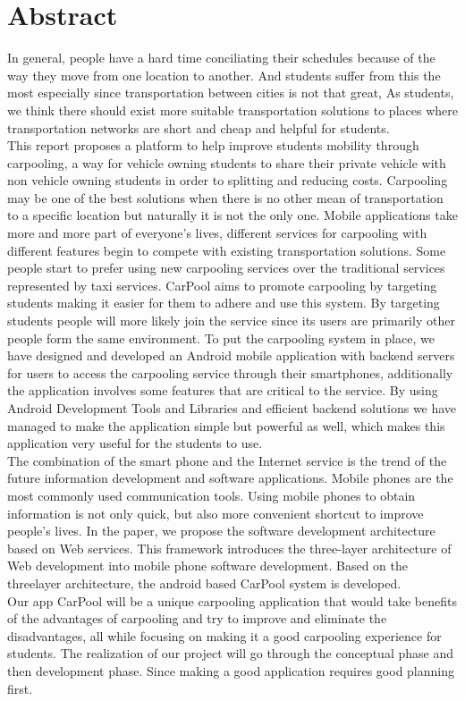 \chapter*{Abstract}
In general, people have a hard time conciliating their schedules because of the way they move from one location to another.  And students suffer from this the most  especially  since transportation between cities is not that great,  As students, we think there should exist more suitable transportation solutions to places where transportation networks are short and cheap and helpful for students.
\\ This  report  proposes  a  platform  to  help  improve students  mobility  through carpooling, a way for vehicle owning students to share their private vehicle with non vehicle owning students in order to splitting and reducing costs. Carpooling may be one of the best solutions when there is no other  mean  of  transportation  to a  specific location  but naturally  it  is not  the  only one. Mobile  applications  take more  and more  part of  everyone’s  lives, different  services for carpooling with different features begin to compete with existing transportation solutions. Some people start to  prefer using  new carpooling  services  over the  traditional services represented  by  taxi  services. CarPool  aims  to  promote  carpooling  by  targeting  students making it easier for them to adhere and use this system.  By  targeting  students  people  will  more  likely  join  the  service  since  its  users  are primarily other people form the same environment. To put the carpooling system in place, we have designed and developed an Android mobile application with backend servers for users  to  access  the  carpooling  service  through  their  smartphones,  additionally  the application  involves  some  features  that  are  critical  to  the  service.  By  using  Android Development  Tools  and  Libraries and  efficient backend  solutions  we  have managed  to make the application simple but powerful as well, which makes this application very useful for the students to use.
\\ The combination of the smart phone and the Internet service is the trend of the future information development and software applications. Mobile phones are the most commonly used communication tools. Using mobile phones to obtain information is not only quick, but also more convenient shortcut to improve people's lives. In the paper, we propose the software development architecture based on Web services. This framework introduces the three-layer architecture of Web development into mobile phone software development. Based on the threelayer architecture, the android based CarPool system is developed.
\\ Our app CarPool will be a unique carpooling application that would take benefits of the advantages of carpooling and try to improve and eliminate the disadvantages, all while focusing on making it a good carpooling experience for students. The realization of our project will go through the conceptual phase and then development phase. Since making a good application requires good planning first.